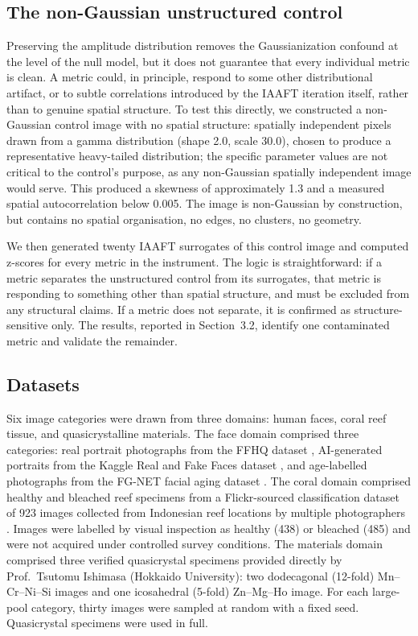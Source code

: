 \documentclass[a4paper,12pt]{article}
\begin{document}
\subsection{The non-Gaussian unstructured control}

Preserving the amplitude distribution removes the Gaussianization confound at the level of the null model, but it does not guarantee that every individual metric is clean. A metric could, in principle, respond to some other distributional artifact, or to subtle correlations introduced by the IAAFT iteration itself, rather than to genuine spatial structure. To test this directly, we constructed a non-Gaussian control image with no spatial structure: spatially independent pixels drawn from a gamma distribution (shape 2.0, scale 30.0), chosen to produce a representative heavy-tailed distribution; the specific parameter values are not critical to the control's purpose, as any non-Gaussian spatially independent image would serve. This produced a skewness of approximately 1.3 and a measured spatial autocorrelation below 0.005. The image is non-Gaussian by construction, but contains no spatial organisation, no edges, no clusters, no geometry.

We then generated twenty IAAFT surrogates of this control image and computed z-scores for every metric in the instrument. The logic is straightforward: if a metric separates the unstructured control from its surrogates, that metric is responding to something other than spatial structure, and must be excluded from any structural claims. If a metric does not separate, it is confirmed as structure-sensitive only. The results, reported in Section~3.2, identify one contaminated metric and validate the remainder.

\subsection{Datasets}

Six image categories were drawn from three domains: human faces, coral reef tissue, and quasicrystalline materials. The face domain comprised three categories: real portrait photographs from the FFHQ dataset \citep{karras2019}, AI-generated portraits from the Kaggle Real and Fake Faces dataset \citep{xhlulu2020}, and age-labelled photographs from the FG-NET facial aging dataset \citep{panis2016}. The coral domain comprised healthy and bleached reef specimens from a Flickr-sourced classification dataset of 923 images collected from Indonesian reef locations by multiple photographers \citep{muhammad2023}. Images were labelled by visual inspection as healthy (438) or bleached (485) and were not acquired under controlled survey conditions. The materials domain comprised three verified quasicrystal specimens provided directly by Prof.\ Tsutomu Ishimasa (Hokkaido University): two dodecagonal (12-fold) Mn--Cr--Ni--Si images and one icosahedral (5-fold) Zn--Mg--Ho image. For each large-pool category, thirty images were sampled at random with a fixed seed. Quasicrystal specimens were used in full.
\end{document}
